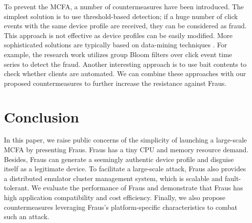 \documentclass[conference]{IEEEtranl}
\begin{document}
	To prevent the MCFA, a number of countermeasures have been introduced. The simplest solution is to use threshold-based detection; 
	if a huge number of click events with the same device profile are received, they can be considered as fraud. This approach is not effective as device profiles can be easily modified. More sophisticated solutions are typically based on data-mining techniques \cite{zhu2017ad}. For example, the research work \cite{zhang2008detecting} utilizes group Bloom filters over click event time series to detect the fraud. Another interesting approach is to use bait contents \cite{haddadi2010fighting} to check whether clients are automated.
	We can combine these approaches with our proposed countermeasures to further increase the resistance against Fraus.




	\section{Conclusion}\label{conclusion}
	In this paper, we raise public concerns of the simplicity of launching a large-scale MCFA by presenting Fraus. Fraus has a tiny CPU and memory resource demand. Besides, Fraus can generate a seemingly authentic device profile and disguise itself as a legitimate device. To facilitate a large-scale attack, Fraus also provides a distributed emulator cluster management system, which is scalable and fault-tolerant. We evaluate the performance of Fraus and demonstrate that Fraus has high application compatibility and cost efficiency. Finally, we also propose countermeasures leveraging Fraus's platform-specific characteristics to combat such an attack.

	\begin{spacing}{0.8} 

	
	
	\end{spacing}
	
\end{document}
